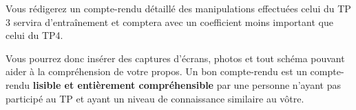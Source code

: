 Vous rédigerez un compte-rendu détaillé des manipulations effectuées celui du TP 3 servira d'entraînement et comptera avec un coefficient moins important que celui du TP4.


Vous pourrez donc insérer des captures d'écrans, photos et tout schéma pouvant aider à la compréhension de votre propos.
Un bon compte-rendu est un compte-rendu \textbf{lisible et entièrement compréhensible} par une personne n'ayant pas participé au TP et ayant un niveau de connaissance similaire au vôtre.

